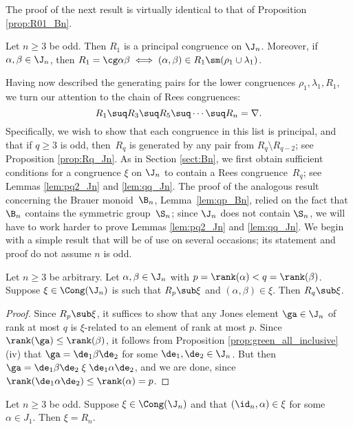 The proof of the next result is virtually identical to that of Proposition \ref{prop:R01_Bn}.


\begin{proposition}\label{prop:R01_Jn}
Let $n\geq3$ be odd.  Then $R_1$ is a principal congruence on $\J_n$.  Moreover, if $\alpha,\beta\in\J_n$, then $R_1=\cg\alpha\beta\iff(\alpha,\beta)\in R_1\sm(\rho_1\cup\lambda_1)$.  \epfres
\end{proposition}




Having now described the generating pairs for the lower congruences $\rho_1,\lambda_1,R_1$, we turn our attention to the chain of Rees congruences:
\[
R_1\suq R_3\suq R_5\suq\cdots\suq R_n=\nabla.
\]
Specifically, we wish to show that each congruence in this list is principal, and that if $q\geq3$ is odd, then~$R_q$ is generated by any pair from $R_q\setminus R_{q-2}$; see Proposition \ref{prop:Rq_Jn}.
%
As in Section \ref{sect:Bn}, we first obtain sufficient conditions for a congruence $\xi$ on $\J_n$ to contain a Rees congruence~$R_q$; see Lemmas \ref{lem:pq2_Jn} and \ref{lem:qq_Jn}.
%
The proof of the analogous result concerning the Brauer monoid~$\B_n$, Lemma~\ref{lem:qp_Bn}, relied on the fact that $\B_n$ contains the symmetric group~$\S_n$; since $\J_n$ does not contain $\S_n$, we will have to work harder to prove Lemmas \ref{lem:pq2_Jn} and \ref{lem:qq_Jn}.
%
We begin with a simple result that will be of use on several occasions; its statement and proof do not assume $n$ is odd.



\begin{lemma}\label{lem:pq_Jn}
Let $n\geq3$ be arbitrary.  Let $\alpha,\beta\in\J_n$ with $p=\rank(\alpha)<q=\rank(\beta)$.  Suppose ${\xi\in\Cong(\J_n)}$ is such that $R_p\sub\xi$ and $(\alpha,\beta)\in\xi$.  Then $R_q\sub\xi$.
\end{lemma}

\begin{proof} Since $R_p\sub\xi$, it suffices to show that any Jones element $\ga\in\J_n$ of rank at most $q$ is $\xi$-related to an element of rank at most $p$.  Since $\rank(\ga)\leq\rank(\beta)$, it follows from Proposition \ref{prop:green_all_inclusive}(iv) that $\ga=\de_1\beta\de_2$ for some $\de_1,\de_2\in\J_n$.  But then $\ga=\de_1\beta\de_2 \mathrel\xi \de_1\alpha\de_2$, and we are done, since $\rank(\de_1\alpha\de_2)\leq\rank(\alpha)=p$. \end{proof}


%
\begin{lemma}
\label{lem:1z_Jn}
Let $n\geq3$ be odd.  Suppose $\xi\in\Cong(\J_n)$ and that $(\id_n,\alpha)\in\xi$ for some $\alpha\in J_1$.  Then $\xi=R_n$.
\end{lemma}

